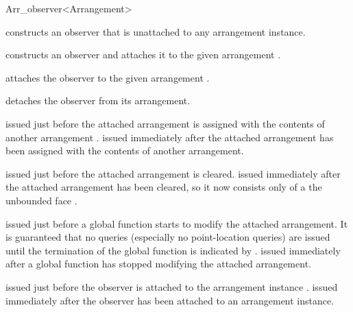 \begin{ccRefClass}{Arr_observer<Arrangement>}
\ccCreation
{}

    {constructs an observer that is unattached to any arrangement instance.}
 
    {constructs an observer and attaches it to the given arrangement 
     .}

\ccModifiers

    {attaches the observer to the given arrangement .}

    {detaches the observer from its arrangement.}



    {issued just before the attached arrangement is assigned with the contents
     of another arrangement .}
\ccGlue
{}
    {issued immediately after the attached arrangement has been assigned with
     the contents of another arrangement.}

    {issued just before the attached arrangement is cleared.}
\ccGlue
{}
    {issued immediately after the attached arrangement has been cleared, so it
     now consists only of a the unbounded face .}

    {issued just before a global function starts to modify the attached
     arrangement. It is guaranteed that no queries (especially no 
     point-location queries) are issued until the termination of the global
     function is indicated by .}
\ccGlue
{}
    {issued immediately after a global function has stopped modifying the
     attached arrangement.}


    {issued just before the observer is attached to the arrangement instance
     .}
\ccGlue
{}
    {issued immediately after the observer has been attached to an
     arrangement instance.}


\end{ccRefClass}
